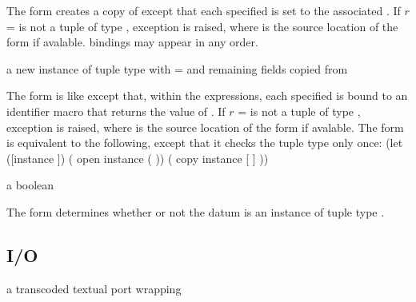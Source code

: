 The  form creates a copy of  except that
each specified  is set to the associated . If
$r$ =  is not a tuple of type , exception
 is raised, where
 is the source location of the  form if
avalable.   bindings may appear in any order.

\begin{syntax}
\end{syntax}
\returns{} a new instance of tuple type  with  =
 \etc{} and remaining fields copied from 

The  form is like  except that, within the  expressions,
each specified  is bound to an identifier macro that returns the value of .
If $r$ =  is not a tuple of type , exception
 is raised, where
 is the source location of the  form if avalable.
The  form is equivalent to the following, except that it
checks the tuple type only once:
\antipar\codebegin
(let ([instance ])
  ( open instance ( \etc{}))
  ( copy instance [ ] \etc{}))
\codeend\antipar

\begin{syntax}
\end{syntax}
\returns{} a boolean

The  form determines whether or not the datum  is
an instance of tuple type .

\subsection {I/O}

\begin{procedure}
\end{procedure}
\returns{} a transcoded textual port wrapping 

